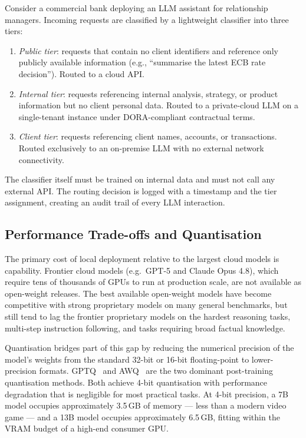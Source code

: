 \begin{example}
\label{ex:ch15-routing}
Consider a commercial bank deploying an LLM assistant for relationship managers. Incoming requests are classified by a lightweight classifier into three tiers:
\begin{enumerate}
  \item \emph{Public tier}: requests that contain no client identifiers and reference only publicly available information (e.g., ``summarise the latest ECB rate decision''). Routed to a cloud API.
  \item \emph{Internal tier}: requests referencing internal analysis, strategy, or product information but no client personal data. Routed to a private-cloud LLM on a single-tenant instance under DORA-compliant contractual terms.
  \item \emph{Client tier}: requests referencing client names, accounts, or transactions. Routed exclusively to an on-premise LLM with no external network connectivity.
\end{enumerate}
The classifier itself must be trained on internal data and must not call any external API. The routing decision is logged with a timestamp and the tier assignment, creating an audit trail of every LLM interaction.
\end{example}

\subsection{Performance Trade-offs and Quantisation}
\label{sec:ch15-quantisation}

The primary cost of local deployment relative to the largest cloud models is capability. Frontier cloud models (e.g.\ GPT-5 and Claude Opus 4.8), which require tens of thousands of GPUs to run at production scale, are not available as open-weight releases. The best available open-weight models have become competitive with strong proprietary models on many general benchmarks, but still tend to lag the frontier proprietary models on the hardest reasoning tasks, multi-step instruction following, and tasks requiring broad factual knowledge.

Quantisation bridges part of this gap by reducing the numerical precision of the model's weights from the standard 32-bit or 16-bit floating-point to lower-precision formats. GPTQ~\citep{frantar2022gptq} and AWQ~\citep{lin2023awq} are the two dominant post-training quantisation methods. Both achieve 4-bit quantisation with performance degradation that is negligible for most practical tasks. At 4-bit precision, a 7B model occupies approximately 3.5\,GB of memory — less than a modern video game — and a 13B model occupies approximately 6.5\,GB, fitting within the VRAM budget of a high-end consumer GPU.

